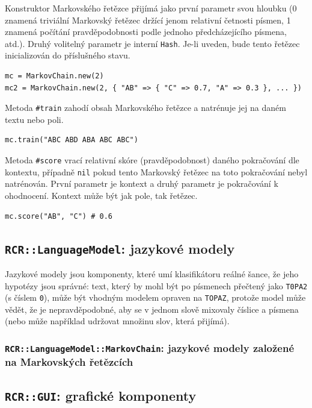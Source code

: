 \documentclass[a4paper]{article}
\begin{document}
Konstruktor Markovského řetězce přijímá jako první parametr svou hloubku (0
znamená triviální Markovský řetězec držící jenom relativní četnosti písmen, 1
znamená počítání pravděpodobnosti podle jednoho předcházejícího písmena, atd.).
Druhý volitelný parametr je interní \texttt{Hash}. Je-li uveden, bude tento
řetězec inicializován do příslušného stavu.
\begin{lstlisting}
mc = MarkovChain.new(2)
mc2 = MarkovChain.new(2, { "AB" => { "C" => 0.7, "A" => 0.3 }, ... })
\end{lstlisting}

Metoda \texttt{\#train} zahodí obsah Markovského řetězce a natrénuje jej na
daném textu nebo poli.
\begin{lstlisting}
mc.train("ABC ABD ABA ABC ABC")
\end{lstlisting}

Metoda \texttt{\#score} vrací relativní skóre (pravděpodobnost) daného
pokračování dle kontextu, případně \texttt{nil} pokud tento Markovský řetězec
na toto pokračování nebyl natrénován. První parametr je kontext a druhý parametr
je pokračování k ohodnocení. Kontext může být jak pole, tak řetězec.
\begin{lstlisting}
mc.score("AB", "C") # 0.6
\end{lstlisting}


\subsection{\texttt{RCR::LanguageModel}: jazykové modely}
Jazykové modely jsou komponenty, které umí klasifikátoru 
reálné šance, že jeho hypotézy jsou správné: text,
který by mohl být po písmenech přečtený jako \texttt{T0PA2} (s číslem
\texttt{0}), může být vhodným modelem opraven na \texttt{TOPAZ}, protože
model může vědět, že je nepravděpodobné, aby se v jednom slově mixovaly
číslice a písmena (nebo může například udržovat množinu slov, která
přijímá).


\subsubsection{\texttt{RCR::LanguageModel::MarkovChain}: jazykové modely
založené na Markovských řetězcích}

\subsection{\texttt{RCR::GUI}: grafické komponenty}
\end{document}
